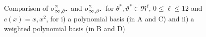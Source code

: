 \begin{figure}[htbp]
	\centering
	\mbox{
	 \quad
	}

	\mbox{
	 \quad 
	}
	\caption{Comparison of ${\sigma^2_\infty}_{,\theta^*}$ and ${\sigma^2_\infty}_{,\vartheta^*}$ for $\theta^*, \vartheta^* \in \Re^{\ell}$, $0 \leq \ell \leq 12$ and $c(x) = x, x^2$, for i) a polynomial basis (in A and C) and ii) a weighted polynomial basis (in B and D)}
	\label{fig:mcmc_var_vs_asym_var}
\end{figure}

